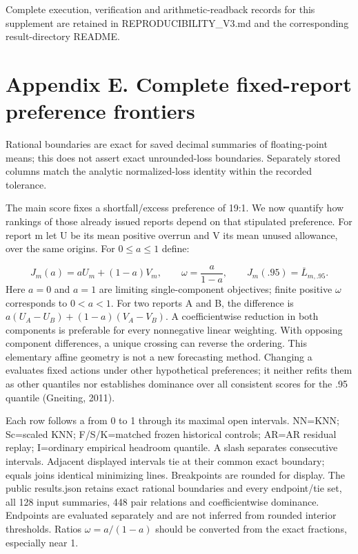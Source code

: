 \documentclass[10pt,a4paper]{article}
\begin{document}
Complete execution, verification and arithmetic-readback records for this supplement are retained in REPRODUCIBILITY\_V3.md and the corresponding result-directory README.

\section*{Appendix E. Complete fixed-report preference frontiers}
Rational boundaries are exact for saved decimal summaries of floating-point means; this does not assert exact unrounded-loss boundaries. Separately stored columns match the analytic normalized-loss identity within the recorded tolerance.

The main score fixes a shortfall/excess preference of 19:1. We now quantify how rankings of those already issued reports depend on that stipulated preference. For report m let U be its mean positive overrun and V its mean unused allowance, over the same origins. For \(0\le a\le1\) define:

\[
J_m(a)=aU_m+(1-a)V_m,\qquad \omega=\frac{a}{1-a},\qquad J_m(.95)=\overline L_{m,.95}.
\]
Here \(a=0\) and \(a=1\) are limiting single-component objectives; finite positive \(\omega\) corresponds to \(0<a<1\). For two reports A and B, the difference is \(a(U_A-U_B)+(1-a)(V_A-V_B)\). A coefficientwise reduction in both components is preferable for every nonnegative linear weighting. With opposing component differences, a unique crossing can reverse the ordering. This elementary affine geometry is not a new forecasting method. Changing a evaluates fixed actions under other hypothetical preferences; it neither refits them as other quantiles nor establishes dominance over all consistent scores for the .95 quantile (Gneiting, 2011).

Each row follows a from 0 to 1 through its maximal open intervals. NN=KNN; Sc=scaled KNN; F/S/K=matched frozen historical controls; AR=AR residual replay; I=ordinary empirical headroom quantile. A slash separates consecutive intervals. Adjacent displayed intervals tie at their common exact boundary; equals joins identical minimizing lines. Breakpoints are rounded for display. The public results.json retains exact rational boundaries and every endpoint/tie set, all 128 input summaries, 448 pair relations and coefficientwise dominance. Endpoints are evaluated separately and are not inferred from rounded interior thresholds. Ratios \(\omega=a/(1-a)\) should be converted from the exact fractions, especially near 1.
\end{document}
